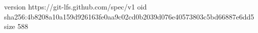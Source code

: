 version https://git-lfs.github.com/spec/v1
oid sha256:4b8208a10a159d926163fe0aa9c02cd0b2039d076e40573803c5bd66887e6dd5
size 588
